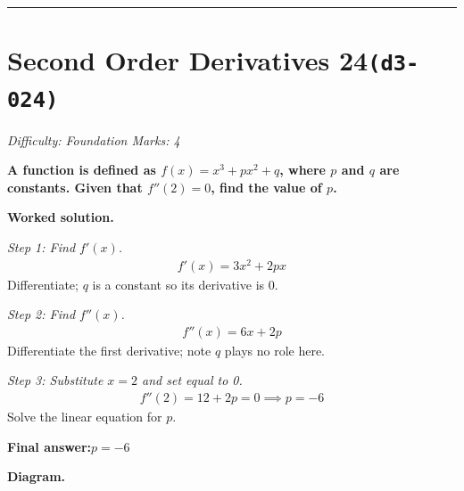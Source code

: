 \documentclass[11pt]{article}
\newcommand{\question}[1]{\par\medskip\noindent\textbf{#1}\par}
\begin{document}
\medskip\hrule

\section*{Second Order Derivatives 24\quad\small\texttt{(d3-024)}}
\textit{Difficulty: Foundation \quad\textbar\quad Marks: 4}

\question{A function is defined as \( f(x) = x^3 + px^2 + q \), where \( p \) and \( q \) are constants. Given that \( f''(2) = 0 \), find the value of \( p \).}

\textbf{Worked solution.}

\textit{Step 1: Find \( f'(x) \).}
\[\begin{gathered}
f'(x) = 3x^2 + 2px
\end{gathered}\]
Differentiate; \( q \) is a constant so its derivative is 0.

\textit{Step 2: Find \( f''(x) \).}
\[\begin{gathered}
f''(x) = 6x + 2p
\end{gathered}\]
Differentiate the first derivative; note \(q\) plays no role here.

\textit{Step 3: Substitute \( x = 2 \) and set equal to 0.}
\[\begin{gathered}
f''(2) = 12 + 2p = 0 \implies p = -6
\end{gathered}\]
Solve the linear equation for \( p \).

\begin{answerbox}
\textbf{Final answer:}\quad \(\displaystyle  p = -6 \)
\end{answerbox}
\textbf{Diagram.}
\end{document}
